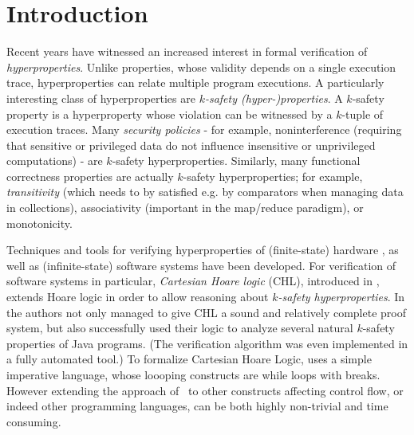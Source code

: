 \section{Introduction}
Recent years have witnessed an increased interest in formal verification of
\emph{hyperproperties}. Unlike properties, whose validity depends on a single
execution trace, hyperproperties can relate multiple program executions. A
particularly interesting class of hyperproperties are \emph{$k$-safety
  (hyper-)properties}. %
A $k$-safety property is a hyperproperty whose violation can be witnessed by a
$k$-tuple of execution traces.  Many \emph{security policies} - for example,
noninterference (requiring that sensitive or privileged data do not influence
insensitive or unprivileged computations) - are $k$-safety hyperproperties.
Similarly, many functional correctness properties are actually $k$-safety
hyperproperties; for example, \emph{transitivity} (which needs to by satisfied
e.g. by comparators when managing data in collections), associativity
(important in the map/reduce paradigm), or monotonicity.


Techniques and tools for verifying hyperproperties of (finite-state) hardware
\cite{CoenenFST19,FinkbeinerRS15}, as well as (infinite-state) software
systems have been developed.  For verification of software systems in
particular, \emph{Cartesian Hoare logic} (CHL), introduced in \cite{SousaD16},
extends Hoare logic in order to allow reasoning about \emph{$k$-safety
  hyperproperties}. In \cite{SousaD16} the authors not only managed to give
CHL a sound and relatively complete proof system, but also successfully used
their logic to analyze several natural $k$-safety properties of Java
programs. (The verification algorithm was even implemented in a fully automated
tool.) To formalize Cartesian Hoare Logic, \cite{SousaD16} uses a simple
imperative language, whose loooping constructs are while loops with
breaks. However extending the approach of~\cite{SousaD16} to
other constructs affecting control flow, or indeed other programming
languages, can be both highly non-trivial and time consuming.


